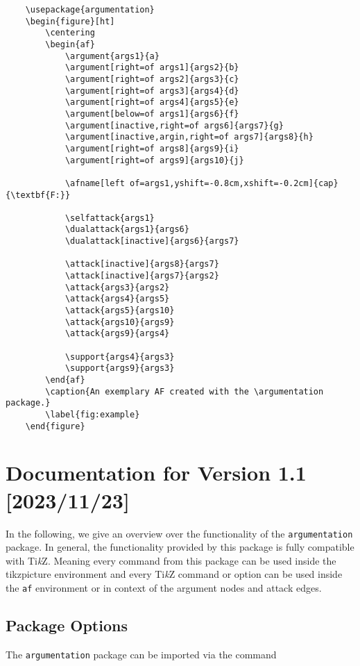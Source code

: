 \documentclass{article}
\newcommand{\tikzname}{Ti\emph{k}Z\xspace}
\newcommand{\argumentation}{\texttt{argumentation}\xspace}
\begin{document}
\begin{verbatim}
    \usepackage{argumentation}
    \begin{figure}[ht]
        \centering
        \begin{af}
            \argument{args1}{a}
            \argument[right=of args1]{args2}{b}
            \argument[right=of args2]{args3}{c}
            \argument[right=of args3]{args4}{d}
            \argument[right=of args4]{args5}{e}
            \argument[below=of args1]{args6}{f}
            \argument[inactive,right=of args6]{args7}{g}
            \argument[inactive,argin,right=of args7]{args8}{h}
            \argument[right=of args8]{args9}{i}
            \argument[right=of args9]{args10}{j}
    
            \afname[left of=args1,yshift=-0.8cm,xshift=-0.2cm]{cap}{\textbf{F:}}
    
            \selfattack{args1}
            \dualattack{args1}{args6}
            \dualattack[inactive]{args6}{args7}
            
            \attack[inactive]{args8}{args7}
            \attack[inactive]{args7}{args2}
            \attack{args3}{args2}    
            \attack{args4}{args5}
            \attack{args5}{args10}
            \attack{args10}{args9}
            \attack{args9}{args4}

            \support{args4}{args3}
            \support{args9}{args3}
        \end{af}
        \caption{An exemplary AF created with the \argumentation package.}
        \label{fig:example}
    \end{figure}
\end{verbatim}

\section{Documentation for Version 1.1 [2023/11/23]}
In the following, we give an overview over the functionality of the \argumentation package.
In general, the functionality provided by this package is fully compatible with \tikzname.
Meaning every command from this package can be used inside the \textsf{tikzpicture} environment and every \tikzname command or option can be used inside the \texttt{af} environment or in context of the argument nodes and attack edges.

\subsection{Package Options}
    The \argumentation package can be imported via the command
    
\end{document}
